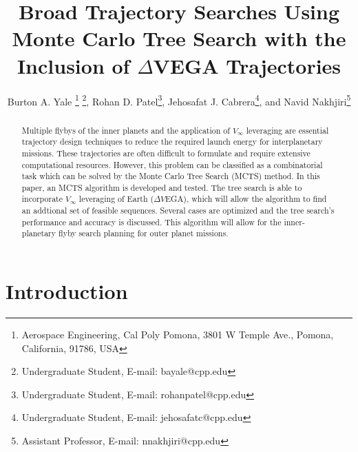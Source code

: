 \documentclass[letterpaper, preprint, paper,11pt]{AAS}	%
\begin{document}
\title{Broad Trajectory Searches Using Monte Carlo Tree Search with the Inclusion of $\Delta$VEGA Trajectories}

\author{
    Burton A. Yale
        \thanks{Aerospace Engineering, Cal Poly Pomona, 3801 W Temple Ave., Pomona, California, 91786, USA}
        \thanks{Undergraduate Student, E-mail: bayale@cpp.edu},
    Rohan D. Patel\footnotemark[1]
        \thanks{Undergraduate Student, E-mail: rohanpatel@cpp.edu},
    Jehosafat J. Cabrera\footnotemark[1]
        \thanks{Undergraduate Student, E-mail: jehosafatc@cpp.edu},
    and Navid Nakhjiri\footnotemark[1]
        \thanks{Assistant Professor, E-mail: nnakhjiri@cpp.edu}
}

\maketitle{}

\begin{abstract}
Multiple flybys of the inner planets and the application of $V_{\infty}$ leveraging are essential trajectory design techniques to reduce the required launch energy for interplanetary missions. These trajectories are often difficult to formulate and require extensive computational resources. However, this problem can be classified as a combinatorial task which can be solved by the Monte Carlo Tree Search (MCTS) method. In this paper, an MCTS algorithm is developed and tested. The tree search is able to incorporate $V_\infty$ leveraging of Earth ($\Delta V$EGA), which will allow the algorithm to find an addtional set of feasible sequences. Several cases are optimized and the tree search's performance and accuracy is discussed. This algorithm will allow for the inner-planetary flyby search planning for outer planet missions.
\end{abstract}

\section*{Introduction}
\end{document}
